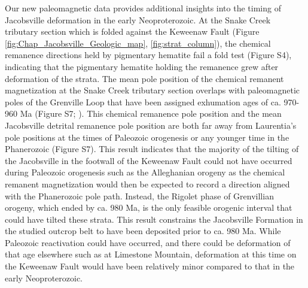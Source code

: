 Our new paleomagnetic data provides additional insights into the timing of Jacobsville deformation in the early Neoproterozoic. At the Snake Creek tributary section which is folded against the Keweenaw Fault (Figure \ref{fig:Chap_Jacobsville_Geologic_map}, \ref{fig:strat_column}), the chemical remanence directions held by pigmentary hematite fail a fold test (Figure S4), indicating that the pigmentary hematite holding the remanence grew after deformation of the strata. The mean pole position of the chemical remanent magnetization at the Snake Creek tributary section overlaps with paleomagnetic poles of the Grenville Loop that have been assigned exhumation ages of ca. 970-960 Ma (Figure S7; \cite{Brown2012a}). This chemical remanence pole position and the mean Jacobsville detrital remanence pole position are both far away from Laurentia's pole positions at the times of Paleozoic orogenesis or any younger time in the Phanerozoic (Figure S7). This result indicates that the majority of the tilting of the Jacobsville in the footwall of the Keweenaw Fault could not have occurred during Paleozoic orogenesis such as the Alleghanian orogeny as the chemical remanent magnetization would then be expected to record a direction aligned with the Phanerozoic pole path. Instead, the Rigolet phase of Grenvillian orogeny, which ended by ca. 980 Ma, is the only feasible orogenic interval that could have tilted these strata. This result constrains the Jacobsville Formation in the studied outcrop belt to have been deposited prior to ca. 980 Ma. While Paleozoic reactivation could have occurred, and there could be deformation of that age elsewhere such as at Limestone Mountain, deformation at this time on the Keweenaw Fault would have been relatively minor compared to that in the early Neoproterozoic.

